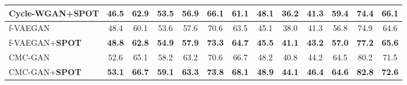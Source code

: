 \documentclass[10pt,twocolumn,letterpaper]{article}
\begin{document}
\begin{table*}[htb]
\begin{center}
\begin{tabular}{|l|c|c|c|c|c|c|c|c|c|c|c|c|}
Cycle-WGAN+\textbf{SPOT}                              & \textbf{46.5}                     & \textbf{62.9}                     & \textbf{53.5}                     & \textbf{56.9}                     & \textbf{66.1}                     & \textbf{61.1}                     & 48.1                              & \textbf{36.2}                     & \textbf{41.3}                     & \textbf{59.4}                     & \textbf{74.4}                     & \textbf{66.1}                     \\
\hline
f-VAEGAN                                     & 48.4                              & 60.1                              & 53.6                              & 57.6                              & 70.6                              & 63.5                              & 45.1                              & 38.0                              & 41.3                              & 56.8                              & 74.9                              & 64.6                              \\
f-VAEGAN+\textbf{SPOT}                               & \textbf{48.8}                     & \textbf{62.8}                     & \textbf{54.9}                     & \textbf{57.9}                     & \textbf{73.3}                     & \textbf{64.7}                     & \textbf{45.5}                     & \textbf{41.1}                     & \textbf{43.2}                     & \textbf{57.0}                     & \textbf{77.2}                     & \textbf{65.6}                     \\
\hline
CMC-GAN                                      & 52.6                              & 65.1                              & 58.2                              & 63.2                              & 70.6                              & 66.7                              & 48.2                              & 40.8                              & 44.2                              & 64.5                              & 80.2                              & 71.5                              \\
CMC-GAN+\textbf{SPOT}                                 & \textbf{53.1}                     & \textbf{66.7}                     & \textbf{59.1}                     & \textbf{63.3}                     & \textbf{73.8}                     & \textbf{68.1}                     & \textbf{48.9}                     & \textbf{44.1}                     & \textbf{46.4}                     & \textbf{64.6}                     & \textbf{82.8}                     & \textbf{72.6}                     \\

\end{tabular}
\end{center}
\end{table*}
\end{document}
